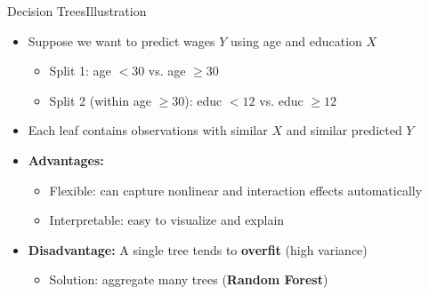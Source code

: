 \documentclass[dvipsnames,hyperref={pdfpagelabels=false}]{beamer}
\begin{document}
\begin{frame}{Decision Trees}{Illustration}
	\begin{itemize}
		\item Suppose we want to predict wages $Y$ using age and education $X$
		\vspace{0.2cm}
		\begin{itemize}
			\item Split 1: age $< 30$ vs. age $\geq 30$
			\vspace{0.2cm}
			\item Split 2 (within age $\geq 30$): educ $< 12$ vs. educ $\geq 12$
		\end{itemize}
		\vspace{0.3cm}
		\item Each leaf contains observations with similar $X$ and similar predicted $Y$
		\vspace{0.3cm}
		\item \textbf{Advantages:}
		\vspace{0.2cm}
		\begin{itemize}
			\item Flexible: can capture nonlinear and interaction effects automatically
			\vspace{0.2cm}
			\item Interpretable: easy to visualize and explain
		\end{itemize}
		\vspace{0.3cm}
		\item \textbf{Disadvantage:} A single tree tends to \textbf{overfit} (high variance)
		\vspace{0.2cm}
		\begin{itemize}
			\item Solution: aggregate many trees (\textbf{Random Forest})
		\end{itemize}
	\end{itemize}
\end{frame}
\end{document}
